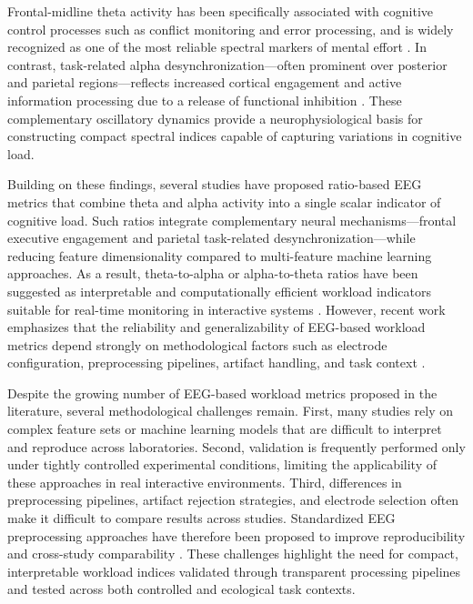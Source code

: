 \documentclass[10pt]{iopart}
\begin{document}
Frontal-midline theta activity has been specifically associated with cognitive control processes such as conflict monitoring and error processing, and is widely recognized as one of the most reliable spectral markers of mental effort \cite{CavanaghFrank2014_FrontalTheta}. In contrast, task-related alpha desynchronization—often prominent over posterior and parietal regions—reflects increased cortical engagement and active information processing due to a release of functional inhibition \cite{Klimesch2007_AlphaInhibitionTiming}. These complementary oscillatory dynamics provide a neurophysiological basis for constructing compact spectral indices capable of capturing variations in cognitive load.

Building on these findings, several studies have proposed ratio-based EEG metrics that combine theta and alpha activity into a single scalar indicator of cognitive load. Such ratios integrate complementary neural mechanisms—frontal executive engagement and parietal task-related desynchronization—while reducing feature dimensionality compared to multi-feature machine learning approaches. As a result, theta-to-alpha or alpha-to-theta ratios have been suggested as interpretable and computationally efficient workload indicators suitable for real-time monitoring in interactive systems \cite{c1,c7}. However, recent work emphasizes that the reliability and generalizability of EEG-based workload metrics depend strongly on methodological factors such as electrode configuration, preprocessing pipelines, artifact handling, and task context \cite{c4,c6,Mastropietro2023_ReliabilityFzPz}.

Despite the growing number of EEG-based workload metrics proposed in the literature, several methodological challenges remain. First, many studies rely on complex feature sets or machine learning models that are difficult to interpret and reproduce across laboratories. Second, validation is frequently performed only under tightly controlled experimental conditions, limiting the applicability of these approaches in real interactive environments. Third, differences in preprocessing pipelines, artifact rejection strategies, and electrode selection often make it difficult to compare results across studies. Standardized EEG preprocessing approaches have therefore been proposed to improve reproducibility and cross-study comparability \cite{BigdelyShamlo2015_PREP}. These challenges highlight the need for compact, interpretable workload indices validated through transparent processing pipelines and tested across both controlled and ecological task contexts.
\end{document}

